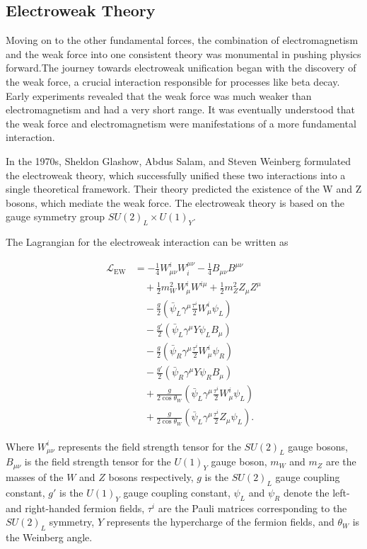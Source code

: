 \subsection{Electroweak Theory}

Moving on to the other fundamental forces,  the combination of electromagnetism  and the weak force into one consistent theory  was monumental in pushing physics forward.The journey towards electroweak unification began with the discovery of the weak force, a crucial interaction responsible for processes like beta decay.
Early experiments revealed that the weak force was much weaker than electromagnetism and had a very short range.
It was eventually understood that the weak force and electromagnetism were manifestations of a more fundamental interaction.

In the 1970s, Sheldon Glashow, Abdus Salam, and Steven Weinberg formulated the electroweak theory, which successfully unified these two interactions into a single theoretical framework.
Their theory predicted the existence of the W and Z bosons, which mediate the weak force.
The electroweak theory is based on the gauge symmetry group $SU(2)_L \times U(1)_Y$.

The Lagrangian for the electroweak interaction can be written as

\begin{align}
\mathcal{L}_{\text{EW}} &= -\frac{1}{4} W^i_{\mu \nu} W^{ \mu \nu}_i - \frac{1}{4} B_{\mu \nu} B^{\mu \nu} \\
&\quad + \frac{1}{2} m_W^2 W^i_\mu W^{i \mu} + \frac{1}{2} m_Z^2 Z_\mu Z^\mu \\
&\quad - \frac{g}{2} \left( \bar{\psi}_L \gamma^\mu \frac{\tau^i}{2} W^i_\mu \psi_L \right) \\
&\quad - \frac{g'}{2} \left( \bar{\psi}_L \gamma^\mu Y \psi_L B_\mu \right) \\
&\quad - \frac{g}{2} \left( \bar{\psi}_R \gamma^\mu \frac{\tau^i}{2} W^i_\mu \psi_R \right) \\
&\quad - \frac{g'}{2} \left( \bar{\psi}_R \gamma^\mu Y \psi_R B_\mu \right) \\
&\quad + \frac{g}{2 \cos \theta_W} \left( \bar{\psi}_L \gamma^\mu \frac{\tau^i}{2} W^i_\mu \psi_L \right) \\
&\quad + \frac{g}{2 \cos \theta_W} \left( \bar{\psi}_L \gamma^\mu \frac{\tau^i}{2} Z_\mu \psi_L \right).
\end{align}

Where $W^i_{\mu \nu}$ represents the field strength tensor for the $SU(2)_L$ gauge bosons, $B_{\mu \nu}$ is the field strength tensor for the $U(1)_Y$ gauge boson, $m_W$ and $m_Z$ are the masses of the $W$ and $Z$ bosons respectively, $g$ is the $SU(2)_L$ gauge coupling constant, $g'$ is the $U(1)_Y$ gauge coupling constant, $\psi_L$ and $\psi_R$ denote the left- and right-handed fermion fields, $\tau^i$ are the Pauli matrices corresponding to the $SU(2)_L$ symmetry, $Y$ represents the hypercharge of the fermion fields, and $\theta_W$ is the Weinberg angle.



